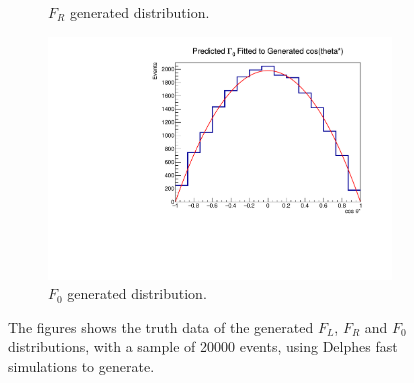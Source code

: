\documentclass[12pt,a4paper]{article}
\numberwithin{equation}{section}
\begin{document}
\begin{figure}[t!]
\begin{subfigure}[t]{0.5\textwidth}
        \caption{$F_R$ generated distribution.}
      \end{subfigure}
    \begin{subfigure}[t]{0.5\textwidth}
        \centering
        \includegraphics[width=1.0\textwidth]{figures/delphes_gen0}
        \caption{$F_0$ generated distribution.}
    \end{subfigure}
    \caption{The figures shows the truth data of the generated $F_L$, $F_R$ and
      $F_0$ distributions, with a sample of 20000 events, using Delphes fast
      simulations to generate.}\label{fig:delphesdist}
\end{figure}
\end{document}
